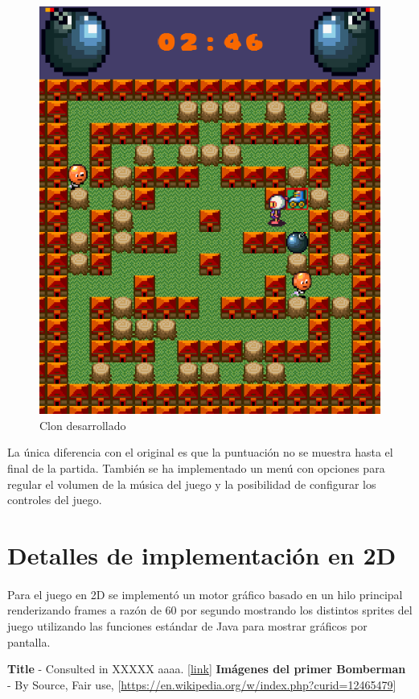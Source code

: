 \documentclass[a4paper]{article}
\begin{document}
\begin{figure}[H]
\begin{minipage}[b]{0.4\textwidth}
		\includegraphics[width=\textwidth]{bomberman.png}
		\caption{Clon desarrollado}
	\end{minipage}
	\label{fig:primerBomberman}
\end{figure}
La única diferencia con el original es que la puntuación no se muestra hasta el final de la partida. También se ha implementado un menú con opciones para regular el volumen de la música del juego y la posibilidad de configurar los controles del juego.
\section{Detalles de implementación en 2D}
\paragraph{}Para el juego en 2D se implementó un motor gráfico basado en un hilo principal renderizando frames a razón de 60 por segundo mostrando los distintos sprites del juego utilizando las funciones estándar de Java para mostrar gráficos por pantalla.
\newpage
\begin{thebibliography}{99} 
 \textbf{Title} - Consulted in XXXXX aaaa. [\url{link}]
 \textbf{Imágenes del primer Bomberman} - By Source, Fair use, [\url{https://en.wikipedia.org/w/index.php?curid=12465479}]

\end{thebibliography}
\end{document}
